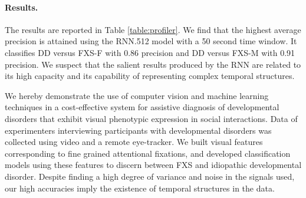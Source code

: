 \documentclass{llncs}
\begin{document}
\paragraph{Results.} The results are reported in Table  \ref{table:profiler}. We find that the highest average precision is attained using the RNN.512 model with a 50 second time window. It classifies DD versus FXS-F with 0.86 precision and DD versus FXS-M with 0.91 precision. We suspect that the salient results produced by the RNN are related to its high capacity and its capability of representing complex temporal structures.

We hereby demonstrate the use of computer vision and machine learning techniques in a cost-effective system for assistive diagnosis of developmental disorders that exhibit visual phenotypic expression in social interactions. Data of experimenters interviewing participants with developmental disorders was collected using video and a remote eye-tracker. We built visual features corresponding to fine grained attentional fixations, and developed classification models using these features to discern between FXS and idiopathic developmental disorder. Despite finding a high degree of variance and noise in the signals used, our high accuracies imply the existence of temporal structures in the data.
  
\end{document}
